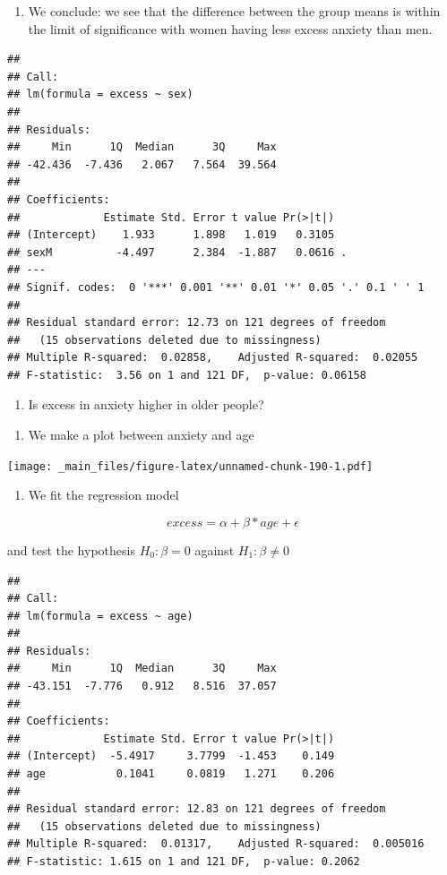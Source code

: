 \documentclass[
]{book}
\providecommand{\tightlist}{%
  \setlength{\itemsep}{0pt}\setlength{\parskip}{0pt}}
\begin{document}
\begin{enumerate}
\def\labelenumi{\alph{enumi}.}
\setcounter{enumi}{1}
\tightlist
\item
  We conclude: we see that the difference between the group means is within the limit of significance with women having less excess anxiety than men.
\end{enumerate}

\begin{verbatim}
## 
## Call:
## lm(formula = excess ~ sex)
## 
## Residuals:
##     Min      1Q  Median      3Q     Max 
## -42.436  -7.436   2.067   7.564  39.564 
## 
## Coefficients:
##             Estimate Std. Error t value Pr(>|t|)  
## (Intercept)    1.933      1.898   1.019   0.3105  
## sexM          -4.497      2.384  -1.887   0.0616 .
## ---
## Signif. codes:  0 '***' 0.001 '**' 0.01 '*' 0.05 '.' 0.1 ' ' 1
## 
## Residual standard error: 12.73 on 121 degrees of freedom
##   (15 observations deleted due to missingness)
## Multiple R-squared:  0.02858,    Adjusted R-squared:  0.02055 
## F-statistic:  3.56 on 1 and 121 DF,  p-value: 0.06158
\end{verbatim}

\begin{enumerate}
\def\labelenumi{\arabic{enumi}.}
\setcounter{enumi}{3}
\tightlist
\item
  Is excess in anxiety higher in older people?
\end{enumerate}

\begin{enumerate}
\def\labelenumi{\alph{enumi}.}
\tightlist
\item
  We make a plot between anxiety and age
\end{enumerate}

\texttt{[image: \_main\_files/figure-latex/unnamed-chunk-190-1.pdf]}

\begin{enumerate}
\def\labelenumi{\alph{enumi}.}
\setcounter{enumi}{1}
\tightlist
\item
  We fit the regression model
\end{enumerate}

\[excess = \alpha + \beta * age + \epsilon\]

and test the hypothesis \(H_0: \beta=0\) against \(H_1: \beta\neq 0\)

\begin{verbatim}
## 
## Call:
## lm(formula = excess ~ age)
## 
## Residuals:
##     Min      1Q  Median      3Q     Max 
## -43.151  -7.776   0.912   8.516  37.057 
## 
## Coefficients:
##             Estimate Std. Error t value Pr(>|t|)
## (Intercept)  -5.4917     3.7799  -1.453    0.149
## age           0.1041     0.0819   1.271    0.206
## 
## Residual standard error: 12.83 on 121 degrees of freedom
##   (15 observations deleted due to missingness)
## Multiple R-squared:  0.01317,    Adjusted R-squared:  0.005016 
## F-statistic: 1.615 on 1 and 121 DF,  p-value: 0.2062
\end{verbatim}
\end{document}
